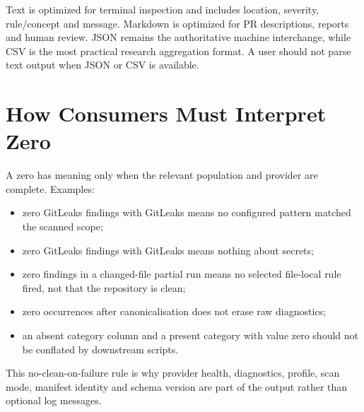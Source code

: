 Text is optimized for terminal inspection and includes location, severity,
rule/concept and message. Markdown is optimized for PR descriptions, reports
and human review. JSON remains the authoritative machine interchange, while
CSV is the most practical research aggregation format. A user should not parse
text output when JSON or CSV is available.

\section{How Consumers Must Interpret Zero}
A zero has meaning only when the relevant population and provider are complete.
Examples:
\begin{itemize}
  \item zero GitLeaks findings with GitLeaks  means no configured
  pattern matched the scanned scope;
  \item zero GitLeaks findings with GitLeaks  means nothing
  about secrets;
  \item zero findings in a changed-file partial run means no selected file-local
  rule fired, not that the repository is clean;
  \item zero occurrences after canonicalisation does not erase raw diagnostics;
  \item an absent category column and a present category with value zero should
  not be conflated by downstream scripts.
\end{itemize}

This no-clean-on-failure rule is why provider health, diagnostics, profile,
scan mode, manifest identity and schema version are part of the output rather
than optional log messages.
